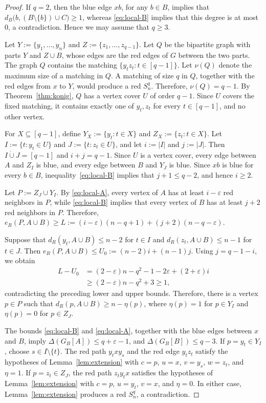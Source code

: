 \documentclass[11pt]{article}
\theoremstyle{definition}
\theoremstyle{remark}
\begin{document}
\begin{proof}
If \(q=2\), then the blue edge \(xb\), for any \(b\in B\), implies
that \(d_B\bigl(b,(B\setminus\{b\})\cup C\bigr)\geq1\), whereas
\eqref{eq:local-B} implies that this degree is at most \(0\), a
contradiction. Hence we may assume that \(q\geq3\).

Let \(Y:=\{y_1,\ldots,y_n\}\) and
\(Z:=\{z_1,\ldots,z_{q-1}\}\). Let \(Q\) be the bipartite graph with
parts \(Y\) and \(Z\cup B\), whose edges are the red edges of \(G\)
between the two parts. The graph \(Q\) contains the matching
\(\{y_tz_t:t\in[q-1]\}\).
Let \(\nu(Q)\) denote the maximum size of a matching in \(Q\).
A matching of size \(q\) in \(Q\), together with the red edges from
\(x\) to \(Y\), would produce a red \(S_n^q\). Therefore,
\(\nu(Q)=q-1\).
By Theorem~\ref{thm:konig}, \(Q\) has a vertex cover \(U\)
of order \(q-1\). Since \(U\) covers the fixed matching, it contains
exactly one of \(y_t,z_t\) for every \(t\in[q-1]\), and no other
vertex.

For \(X\subseteq[q-1]\), define \(Y_X:=\{y_t:t\in X\}\) and
\(Z_X:=\{z_t:t\in X\}\). Let \(I:=\{t:y_t\in U\}\) and
\(J:=\{t:z_t\in U\}\), and let \(i:=|I|\) and \(j:=|J|\). Then
\(I\mathbin{\dot\cup}J=[q-1]\) and \(i+j=q-1\).
Since \(U\) is a vertex cover, every edge between \(A\) and \(Z_I\)
is blue, and every edge between \(B\) and \(Y_J\) is blue. Since
\(xb\) is blue for every \(b\in B\),
inequality~\eqref{eq:local-B} implies that \(j+1\leq q-2\), and hence
\(i\geq2\).

Let \(P:=Z_J\cup Y_I\).
By \eqref{eq:local-A}, every vertex of \(A\) has at least
\(i-\varepsilon\) red neighbors in \(P\), while
\eqref{eq:local-B} implies that every vertex of \(B\) has at least
\(j+2\) red neighbors in \(P\). Therefore,
\(e_R(P,A\cup B)\geq L:=(i-\varepsilon)(n-q+1) +(j+2)(n-q-\varepsilon)\).

Suppose that \(d_R(y_t,A\cup B)\leq n-2\) for \(t\in I\) and
\(d_R(z_t,A\cup B)\leq n-1\) for \(t\in J\).
Then
\(e_R(P,A\cup B)\leq U_0:=(n-2)i+(n-1)j\).
Using \(j=q-1-i\), we obtain
\[
\begin{aligned}
 L-U_0
 &=(2-\varepsilon)n-q^2-1-2\varepsilon
   +(2+\varepsilon)i\\
 &\geq(2-\varepsilon)n-q^2+3
 \geq1,
\end{aligned}
\]
contradicting the preceding lower and upper bounds. Therefore, there
is a vertex \(p\in P\) such that
\(d_R(p,A\cup B)\geq n-\eta(p)\),
where
\(\eta(p)=1\) for \(p\in Y_I\) and \(\eta(p)=0\) for \(p\in Z_J\).

The bounds \eqref{eq:local-B} and \eqref{eq:local-A}, together with
the blue edges between \(x\) and \(B\), imply
\(\Delta(G_B[A])\leq q+\varepsilon-1\), and \(\Delta(G_B[B])\leq q-3\).
If \(p=y_t\in Y_I\), choose \(s\in I\setminus\{t\}\). The red path
\(y_txy_s\) and the red edge \(y_tz_t\) satisfy the hypotheses of
Lemma~\ref{lem:extension} with \(c=p\), \(u=x\), \(v=y_s\),
\(w=z_t\), and \(\eta=1\). If \(p=z_t\in Z_J\), the red path
\(z_ty_tx\) satisfies the hypotheses of Lemma~\ref{lem:extension}
with \(c=p\), \(u=y_t\), \(v=x\), and \(\eta=0\). In either case,
Lemma~\ref{lem:extension} produces a red \(S_n^q\), a contradiction.
\end{proof}
\end{document}
